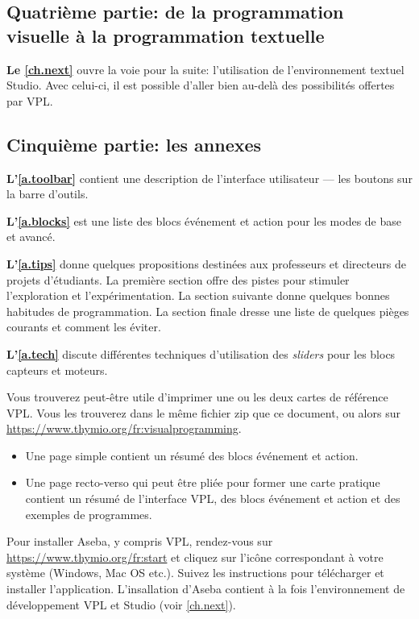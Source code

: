 \bigskip

\subsection*{Quatrième partie: de la programmation visuelle à la programmation textuelle}
\textbf{Le \cref{ch.next}} ouvre la voie pour la suite: l'utilisation de l'environnement textuel Studio.
Avec celui-ci, il est possible d'aller bien au-delà des possibilités offertes par VPL.

\bigskip

\subsection*{Cinquième partie: les annexes}

\textbf{L'\cref{a.toolbar}} contient une description de l'interface utilisateur --- les boutons sur la barre d'outils.

\textbf{L'\cref{a.blocks}} est une liste des blocs événement et action pour les modes de base et avancé.

\textbf{L'\cref{a.tips}} donne quelques propositions destinées aux professeurs et directeurs de projets d'étudiants.
La première section offre des pistes pour stimuler l'exploration et l'expérimentation.
La section suivante donne quelques bonnes habitudes de programmation.
La section finale dresse une liste de quelques pièges courants et comment les éviter.

\textbf{L'\cref{a.tech}} discute différentes techniques d'utilisation des \textit{sliders} pour les blocs capteurs et moteurs.

 \quad {}

Vous trouverez peut-être utile d'imprimer une ou les deux cartes de référence VPL.
Vous les trouverez dans le même fichier zip que ce document, ou alors sur \\\href{https://www.thymio.org/fr:visualprogramming}{https://www.thymio.org/fr:visualprogramming}.

\begin{itemize}
\item Une page simple contient un résumé des blocs événement et action.
\item Une page recto-verso qui peut être pliée pour former une carte pratique contient un résumé de l'interface VPL, des blocs événement et action et des exemples de programmes.
\end{itemize}

Pour installer Aseba, y compris VPL, rendez-vous sur
\href{https://www.thymio.org/fr:start}{https://www.thymio.org/fr:start}
et cliquez sur l'icône correspondant à votre système (Windows, Mac OS etc.).
Suivez les instructions pour télécharger et installer l'application.
L'insallation d'Aseba contient à la fois l'environnement de développement VPL et Studio (voir \cref{ch.next}).

